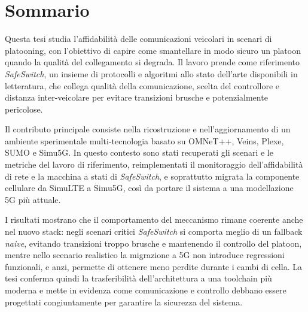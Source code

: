 \chapter*{Sommario}
Questa tesi studia l'affidabilità delle comunicazioni veicolari in scenari di platooning, con l'obiettivo di capire come smantellare in modo sicuro un platoon quando la qualità del collegamento si degrada. Il lavoro prende come riferimento \emph{SafeSwitch}, un insieme di protocolli e algoritmi allo stato dell'arte disponibili in letteratura, che collega qualità della comunicazione, scelta del controllore e distanza inter-veicolare per evitare transizioni brusche e potenzialmente pericolose.

Il contributo principale consiste nella ricostruzione e nell'aggiornamento di un ambiente sperimentale multi-tecnologia basato su OMNeT++, Veins, Plexe, SUMO e Simu5G. In questo contesto sono stati recuperati gli scenari e le metriche del lavoro di riferimento, reimplementati il monitoraggio dell'affidabilità di rete e la macchina a stati di \emph{SafeSwitch}, e soprattutto migrata la componente cellulare da SimuLTE a Simu5G, così da portare il sistema a una modellazione 5G più attuale.

I risultati mostrano che il comportamento del meccanismo rimane coerente anche nel nuovo stack: negli scenari critici \emph{SafeSwitch} si comporta meglio di un fallback \emph{naive}, evitando transizioni troppo brusche e mantenendo il controllo del platoon, mentre nello scenario realistico la migrazione a 5G non introduce regressioni funzionali, e anzi, permette di ottenere meno perdite durante i cambi di cella. La tesi conferma quindi la trasferibilità dell'architettura a una toolchain più moderna e mette in evidenza come comunicazione e controllo debbano essere progettati congiuntamente per garantire la sicurezza del sistema.
